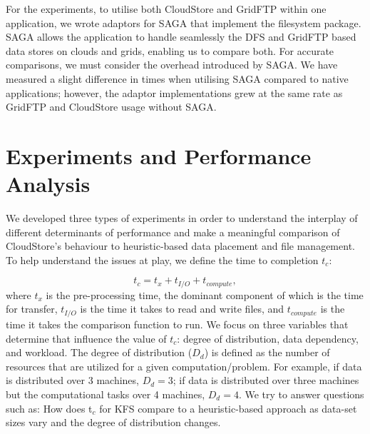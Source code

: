\documentclass{rspublic}
\begin{document}
For the experiments, to utilise both CloudStore and GridFTP within one
application, we wrote adaptors for SAGA that implement the filesystem
package. SAGA allows the application to handle seamlessly the DFS and
GridFTP based data stores on clouds and grids, enabling us to compare
both. For accurate comparisons, we must consider the overhead
introduced by SAGA. We have measured a slight difference in times when
utilising SAGA compared to native applications; however, the adaptor
implementations grew at the same rate as GridFTP and CloudStore usage
without SAGA. 


\vspace{-0.5cm}

\section{Experiments and Performance Analysis} 


We developed three types of experiments in order to understand the
interplay of different determinants of performance and make a
meaningful comparison of CloudStore's behaviour to heuristic-based
data placement and file management. To help understand the issues at
play, we define the time to completion $t_c$:

\vspace{-0.3cm}

 \begin{equation}
t_c = t_x + t_{I/O} + t_{compute},
\end{equation}
where $t_x$ is the pre-processing time, the dominant component of
which is the time for transfer, $t_{I/O}$ is the time it takes to read
and write files, and $t_{compute}$ is the time it takes the comparison
function to run. We focus on three variables that determine that
influence the value of $t_c$: degree of distribution, data dependency,
and workload. The degree of distribution ($D_d$) is defined as the
number of resources that are utilized for a given
computation/problem. For example, if data is distributed over 3
machines, $D_d=3$; if data is distributed over three machines but the
computational tasks over 4 machines, $D_d=4$. We try to answer
questions such as: How does t$_c$ for KFS compare to a heuristic-based
approach as data-set sizes vary and the degree of distribution
changes.
\end{document}
